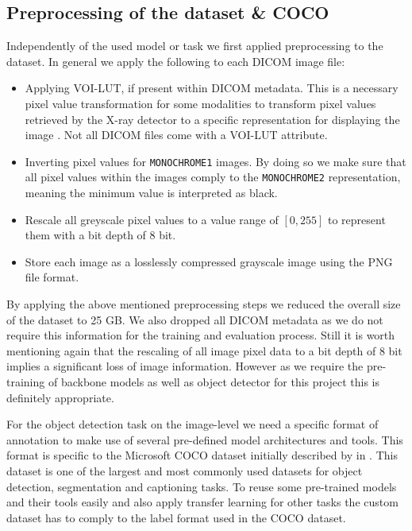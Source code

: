 \subsection*{Preprocessing of the dataset \& COCO}
Independently of the used model or task we first applied preprocessing to the dataset. In general we apply the following to each DICOM image file:
\begin{itemize}
	\item Applying VOI-LUT, if present within DICOM metadata. This is a necessary pixel value transformation for some modalities to transform pixel values retrieved by the X-ray detector to a specific representation for displaying the image \autocite{dicom2018}. Not all DICOM files come with a VOI-LUT attribute.
	\item Inverting pixel values for \texttt{MONOCHROME1} images. By doing so we make sure that all pixel values within the images comply to the \texttt{MONOCHROME2} representation, meaning the minimum value is interpreted as black.
	\item Rescale all greyscale pixel values to a value range of $[0,255]$ to represent them with a bit depth of 8 bit.
	\item Store each image as a losslessly compressed grayscale image using the \ac{PNG} file format.
\end{itemize}

By applying the above mentioned preprocessing steps we reduced the overall size of the dataset to 25 GB. We also dropped all DICOM metadata as we do not require this information for the training and evaluation process. Still it is worth mentioning again that the rescaling of all image pixel data to a bit depth of 8 bit implies a significant loss of image information. However as we require the pre-training of backbone models as well as object detector for this project this is definitely appropriate.

For the object detection task on the image-level we need a specific format of annotation to make use of several pre-defined model architectures and tools. This format is specific to the Microsoft \ac{COCO} dataset initially described by \citeauthor{lin_microsoft_2015} in \citeyear{lin_microsoft_2015}. This dataset is one of the largest and most commonly used datasets for object detection, segmentation and captioning tasks. To reuse some pre-trained models and their tools easily and also apply transfer learning for other tasks the custom dataset has to comply to the label format used in the \ac{COCO} dataset.

